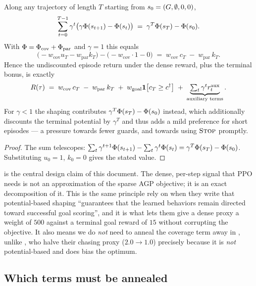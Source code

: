 \documentclass[11pt,a4paper]{article}
\begin{document}
\begin{proposition}\label{prop:telescope}
Along any trajectory of length $T$ starting from $s_0 = (G,\emptyset,0,0)$,
\[
  \sum_{t=0}^{T-1} \gamma^{t}\bigl(\gamma\Phi(s_{t+1}) - \Phi(s_t)\bigr)
  \;=\; \gamma^{T}\Phi(s_T) - \Phi(s_0).
\]
With $\Phi = \Phi_{\mathrm{cov}} + \Phi_{\mathrm{par}}$ and $\gamma = 1$ this equals
\[
  \bigl(-w_{\mathrm{cov}} u_T - w_{\mathrm{par}} k_T\bigr) - \bigl(-w_{\mathrm{cov}} \cdot 1 - 0\bigr)
  \;=\; w_{\mathrm{cov}}\, c_T \;-\; w_{\mathrm{par}}\, k_T .
\]
Hence the undiscounted episode return under the dense reward, plus the terminal bonus, is
exactly
\[
  R(\tau) \;=\; w_{\mathrm{cov}}\,c_T \;-\; w_{\mathrm{par}}\,k_T \;+\; w_{\mathrm{goal}}\mathbf{1}\!\left[c_T \ge c^{\dagger}\right]
  \;+\; \underbrace{\textstyle\sum_t \gamma^t r^{\mathrm{aux}}_t}_{\text{auxiliary terms}} .
\]
For $\gamma < 1$ the shaping contributes $\gamma^T \Phi(s_T) - \Phi(s_0)$ instead, which
additionally discounts the terminal potential by $\gamma^T$ and thus adds a mild preference
for short episodes --- a pressure towards fewer guards, and towards using $\textsc{Stop}$ promptly.
\end{proposition}

\begin{proof}
The sum telescopes: $\sum_{t} \gamma^{t+1}\Phi(s_{t+1}) - \sum_t \gamma^t \Phi(s_t)
= \gamma^T\Phi(s_T) - \Phi(s_0)$. Substituting $u_0 = 1$, $k_0 = 0$ gives the stated value.
\end{proof}

 is the central design claim of this document. The dense, per-step
signal that PPO needs is not an approximation of the sparse AGP objective; it is an exact
decomposition of it. This is the same principle \citet{wang2025vision} rely on when they
write that potential-based shaping ``guarantees that the learned behaviors remain directed
toward successful goal scoring'', and it is what lets them give a dense proxy a weight of
$500$ against a terminal goal reward of $15$ without corrupting the objective. It also
means we do \emph{not} need to anneal the coverage term away in \stageII{}, unlike
\citet{wang2025dribble}, who halve their chasing proxy ($2.0 \to 1.0$) precisely because it
is \emph{not} potential-based and does bias the optimum.

\subsection{Which terms must be annealed}
\end{document}
